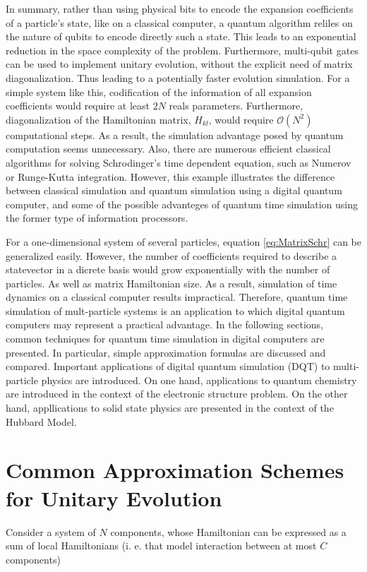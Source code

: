   In summary, rather than using physical bits to encode the expansion coefficients of a particle's state, like on a classical computer, a quantum algorithm reliles on the nature of qubits to encode directly such a state. This leads to an exponential reduction in the space complexity of the problem. Furthermore, multi-qubit gates can be used to implement unitary evolution, without the explicit need of matrix diagonalization. Thus leading to a potentially faster evolution simulation. For a simple system like this, codification of the information of all expansion coefficients would require at least $2N$ reals parameters. Furthermore, diagonalization of the Hamiltonian matrix, $H_{kl}$, would require $\mathcal{O}(N^2)$ computational steps. As a result, the simulation advantage posed by quantum computation seems unnecessary. Also, there are numerous efficient classical algorithms for solving Schrodinger's time dependent equation, such as Numerov or Runge-Kutta integration. However, this example illustrates the difference between classical simulation and quantum simulation using a digital quantum computer, and some of the possible advanteges of quantum time simulation using the former type of information processors.

  For a one-dimensional system of several particles, equation \ref{eq:MatrixSchr} can be generalized easily. However, the number of coefficients required to describe a statevector in a dicrete basis would grow exponentially with the number of particles. As well as matrix Hamiltonian size. As a result, simulation of time dynamics on a classical computer results impractical. Therefore, quantum time simulation of mult-particle systems is an application to which digital quantum computers may represent a practical advantage. In the following sections, common techniques for quantum time simulation in digital computers are presented. In particular, simple approximation formulas are discussed and compared. Important applications of  digital quantum simulation (DQT) to multi-particle physics are introduced. On one hand, applications to quantum chemistry are introduced in the context of the electronic structure problem. On the other hand, appllications to solid state physics are presented in the context of the Hubbard Model.


\section{Common Approximation Schemes for Unitary Evolution}
  Consider a system of $N$ components, whose Hamiltonian can be expressed as a sum of local Hamiltonians (i. e. that model interaction between at most $C$ components) \cite{Nielsen,LloydNature}

